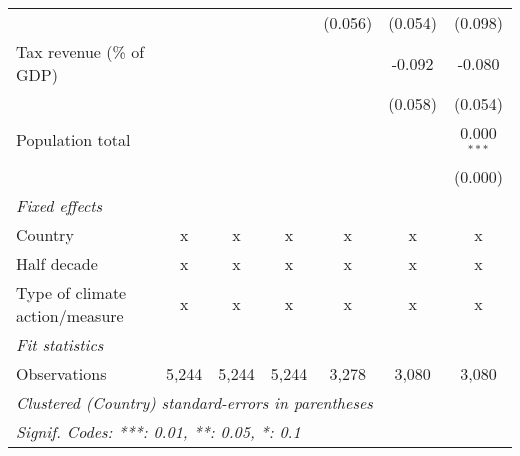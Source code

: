 \begin{tabular}{lcccccc}
                                                                &         &         &               & (0.056)       & (0.054)      & (0.098)\\   
   Tax revenue (\% of GDP)                                      &         &         &               &               & -0.092       & -0.080\\   
                                                                &         &         &               &               & (0.058)      & (0.054)\\   
   Population total                                             &         &         &               &               &              & 0.000$^{***}$\\   
                                                                &         &         &               &               &              & (0.000)\\   
   \emph{Fixed effects}\\
   Country                                                      & x       & x       & x             & x             & x            & x\\  
   Half decade                                                  & x       & x       & x             & x             & x            & x\\  
   Type of climate action/measure                               & x       & x       & x             & x             & x            & x\\  
   \midrule \emph{Fit statistics}\\
   Observations                                                 & 5,244   & 5,244   & 5,244         & 3,278         & 3,080        & 3,080\\  
   \midrule
   \multicolumn{7}{l}{\emph{Clustered (Country) standard-errors in parentheses}}\\
   \multicolumn{7}{l}{\emph{Signif. Codes: ***: 0.01, **: 0.05, *: 0.1}}\\
\end{tabular}
\par\endgroup


